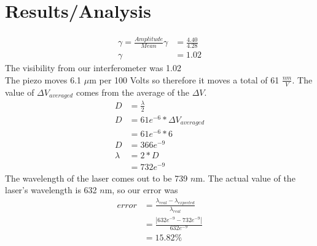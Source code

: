 \section{Results/Analysis}
\begin{align*}
    \gamma= \frac{Amplitude}{Mean}
	\gamma &= \frac{4.40}{4.28} \\
	\gamma &= 1.02
\end{align*} 
The visibility from our interferometer was 1.02 \\
The piezo moves 6.1 $\mu$m per 100 Volts so therefore it moves a total of 61 $\frac{nm}{V}$.
The value of $\Delta V_{averaged}$ comes from the average of the $\Delta V$.
\begin{align*}
	D &= \frac{\lambda}{2} \\
	D &= 61e^{-6} * \Delta V_{averaged} \\
	  &= 61e^{-6} * 6 \\
	D &= 366e^{-9} \\
	\lambda &= 2*D \\
	 &= 732e^{-9}	
\end{align*}
The wavelength of the laser comes out to be 739 $n$m. The actual value of the laser's wavelength is 632 $n$m, so our error was 
	\begin{align*}
		error &=\frac{\lambda_{real}-\lambda_{expected}}{\lambda_{real}} \\
			&= \frac{|632e^{-9}-732e^{-9}|}{632e^{-9}}	\\	
			&= 15.82 \%
	\end{align*}
